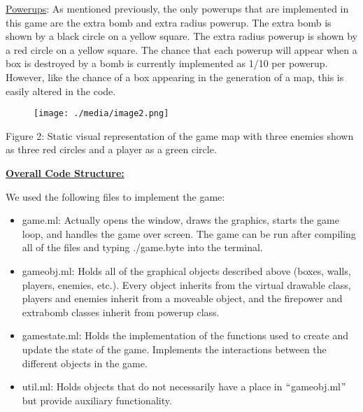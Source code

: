 \documentclass[12pt]{article}
\begin{document}
\vspace{\baselineskip}
\uline{Powerups}: As mentioned previously, the only powerups that are implemented in this game are the extra bomb and extra radius powerup. The extra bomb is shown by a black circle on a yellow square. The extra radius powerup is shown by a red circle on a yellow square. The chance that each powerup will appear when a box is destroyed by a bomb is currently implemented as 1/10 per powerup. However, like the chance of a box appearing in the generation of a map, this is easily altered in the code.\par




\begin{figure}[H]
\advance\leftskip 0.0in		\texttt{[image: ./media/image2.png]}
\end{figure}



Figure 2: Static visual representation of the game map with three enemies shown as three red circles and a player as a green circle.\par


\vspace{\baselineskip}
\textbf{\uline{Overall Code Structure:}}\par

We used the following files to implement the game:\par

\begin{itemize}
	\item game.ml: Actually opens the window, draws the graphics, starts the game loop, and handles the game over screen. The game can be run after compiling all of the files and typing ./game.byte into the terminal.\par

	\item gameobj.ml: Holds all of the graphical objects described above (boxes, walls, players, enemies, etc.). Every object inherits from the virtual drawable class, players and enemies inherit from a moveable object, and the firepower and extrabomb classes inherit from powerup class.\par

	\item gamestate.ml: Holds the implementation of the functions used to create and update the state of the game. Implements the interactions between the different objects in the game.\par

	\item util.ml: Holds objects that do not necessarily have a place in $``$gameobj.ml$"$  but provide auxiliary functionality.
\end{itemize}\par
\end{document}
